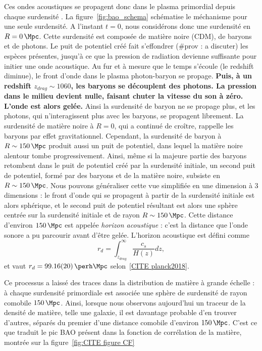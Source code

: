 \documentclass[11pt, twoside, a4paper, openright]{report}
\begin{document}
Ces ondes acoustiques se propagent donc dans le plasma primordial depuis chaque surdensité . La figure~\ref{fig:bao_schema} schématise le méchanisme pour une seule surdensité. A l'instant $t=0$, nous considérons donc une surdensité en $R = \SI{0}{\Mpc}$. Cette surdensité est composée de matière noire (CDM), de baryons et de photons. Le puit de potentiel créé fait s'effondrer (\#prov : a discuter) les espèces présentes, jusqu'à ce que la pression de radiation devienne suffisante pour initier une onde acoustique. Au fur et à mesure que le temps s'écoule (le redshift diminue), le front d'onde dans le plasma photon-baryon se propage. \textbf{Puis, à un redshift $z_{drag} \sim 1060$, les baryons se découplent des photons. La pression dans le milieu devient nulle, faisant chuter la vitesse du son à zéro. L'onde est alors gelée.} Ainsi la surdensité de baryon ne se propage plus, et les photons, qui n'interagissent plus avec les baryons, se propagent librement. La surdensité de matière noire à $R = 0$, qui a continué de croître, rappelle les baryons par effet gravitationnel. Cependant, la surdensité de baryon à $R \sim \SI{150}{\Mpc}$ produit aussi un puit de potentiel, dans lequel la matière noire alentour tombe progressivement. Ainsi, même si la majeure partie des baryons retombent dans le puit de potentiel créé par la surdensité initiale, un second puit de potentiel, formé par des baryons et de la matière noire, subsiste en $R \sim \SI{150}{\Mpc}$. Nous pouvons généraliser cette vue simplifiée en une dimension à 3 dimensions : le front d'onde qui se propagent à partir de la surdensité initiale est alors sphérique, et le second puit de potentiel résultant est alors une sphère centrée sur la surdensité initiale et de rayon $R \sim \SI{150}{\Mpc}$. Cette distance d'environ $\SI{150}{\Mpc}$ est appelée \emph{horizon acoustique} : c'est la distance que l'onde sonore a pu parcourir avant d'être gelée. L'horizon acoustique est défini comme
\begin{equation}
  \label{eq:sound_horizon}
  r_{d} = \int^{\infty}_{z_{drag}} \frac{c_{s}}{H(z)} dz ,
\end{equation}
et vaut $r_{d} = \SI{99.16(20)}{\perh\Mpc}$ selon~\ref{CITE planck2018}.

Ce processus a laissé des traces dans la distribution de matière à grande échelle : à chaque surdensité primordiale est associée une sphère de surdensité de rayon comobile $\SI{150}{\Mpc}$. Ainsi, lorsque nous observons aujourd'hui un traceur de la densité de matière, telle une galaxie, il est davantage probable d'en trouver d'autres, séparés du premier d'une distance comobile d'environ $\SI{150}{\Mpc}$. C'est ce que traduit le pic BAO présent dans la fonction de corrélation de la matière, montrée sur la figure~\ref{fig:CITE figure CF}
\end{document}
